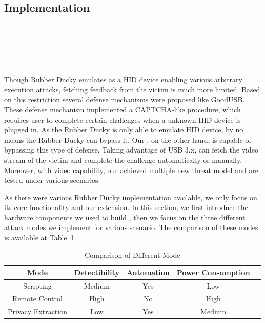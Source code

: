 \subsection{Implementation}
\noindent{}\\
\\
\\
\\
\\
Though Rubber Ducky\cite{rubber} emulates as a HID device enabling various arbitrary execution attacks, fetching feedback from the victim is much more limited. Based on this restriction several defense mechanisms were proposed  like GoodUSB\cite{tian2015defending}. These defense mechanism implemented a CAPTCHA-like\cite{captcha} procedure, which requires user to complete certain challenges when a unknown HID device is plugged in. As the Rubber Ducky is only able to emulate HID device, by no means the Rubber Ducky can bypass it. Our \tool, on the other hand, is capable of bypassing this type of defense. Taking advantage of USB 3.x\cite{usb31}\cite{usb32}, \tool can fetch the video stream of the victim and complete the challenge automatically or manually. Moreover, with video capability, our \tool achieved multiple new threat model and are tested under various scenarios.

As there were various Rubber Ducky implementation available, we only focus on its core functionality and our extension. In this section, we first introduce the hardware components we used to build \tool, then we focus on the three different attack modes we implement  for various scenario. The comparison of these modes is available at Table~\ref{table:mode_comparison}
\begin{table}
	\centering
	\begin{tabular}{|c|c|c|c|c|}
	\hline
	Mode & Detectibility & Automation & Power Consumption  \\
	\hline
	Scripting & Medium & Yes & Low\\
	\hline
	Remote Control & High & No & High \\
	\hline
	Privacy Extraction & Low & Yes & Medium\\
	\hline
	\end{tabular}
	\linebreak
	\caption{Comparison of Different Mode}
	\label{table:mode_comparison}
\end{table}


